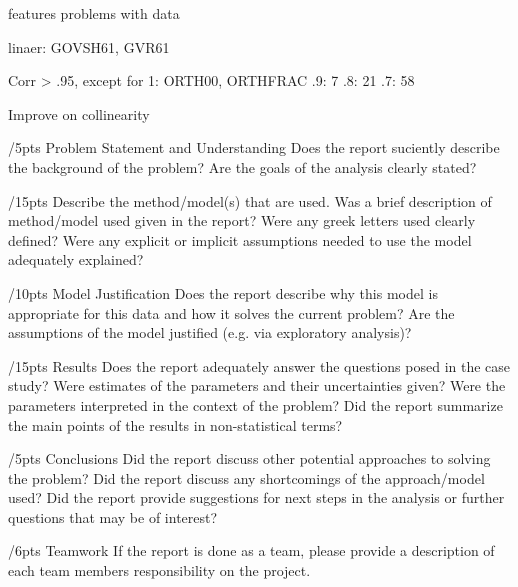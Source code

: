 features
problems with data

linaer: GOVSH61, GVR61

Corr > .95, except for 1: ORTH00, ORTHFRAC
       .9: 7
       .8: 21
       .7: 58

Improve  on collinearity


/5pts Problem Statement and Understanding
  Does the report suciently describe the background of the problem?
  Are the goals of the analysis clearly stated?

/15pts Describe the method/model(s) that are used.
  Was a brief description of method/model used given in the report?
  Were any greek letters used clearly defined?
  Were any explicit or implicit assumptions needed to use the model adequately explained?

/10pts Model Justification
  Does the report describe why this model is appropriate for this data and how it solves
  the current problem?
  Are the assumptions of the model justified (e.g. via exploratory analysis)?

/15pts Results
  Does the report adequately answer the questions posed in the case study?
  Were estimates of the parameters and their uncertainties given?
  Were the parameters interpreted in the context of the problem?
  Did the report summarize the main points of the results in non-statistical terms?

/5pts Conclusions
  Did the report discuss other potential approaches to solving the problem?
  Did the report discuss any shortcomings of the approach/model used?
  Did the report provide suggestions for next steps in the analysis or further questions
  that may be of interest?

/6pts Teamwork
  If the report is done as a team, please provide a description of each team members
  responsibility on the project.

